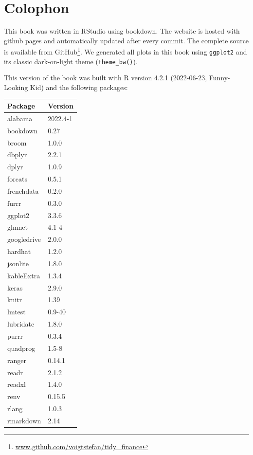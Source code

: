 \documentclass[
]{krantz}
\renewcommand{\href}[2]{#2\footnote{\url{#1}}}
\begin{document}
\hypertarget{colophon}{%
\section*{Colophon}\label{colophon}}


This book was written in RStudio using bookdown. The website is hosted with github pages and automatically updated after every commit. The complete source is \href{www.github.com/voigtstefan/tidy_finance}{available from GitHub}.
We generated all plots in this book using \texttt{ggplot2} and its classic dark-on-light theme (\texttt{theme\_bw()}).

This version of the book was built with R version 4.2.1 (2022-06-23, Funny-Looking Kid) and the following packages:

\begin{tabular}[t]{l|l}
\hline
Package & Version\\
\hline
alabama & 2022.4-1\\
\hline
bookdown & 0.27\\
\hline
broom & 1.0.0\\
\hline
dbplyr & 2.2.1\\
\hline
dplyr & 1.0.9\\
\hline
forcats & 0.5.1\\
\hline
frenchdata & 0.2.0\\
\hline
furrr & 0.3.0\\
\hline
ggplot2 & 3.3.6\\
\hline
glmnet & 4.1-4\\
\hline
googledrive & 2.0.0\\
\hline
hardhat & 1.2.0\\
\hline
jsonlite & 1.8.0\\
\hline
kableExtra & 1.3.4\\
\hline
keras & 2.9.0\\
\hline
knitr & 1.39\\
\hline
lmtest & 0.9-40\\
\hline
lubridate & 1.8.0\\
\hline
purrr & 0.3.4\\
\hline
quadprog & 1.5-8\\
\hline
ranger & 0.14.1\\
\hline
readr & 2.1.2\\
\hline
readxl & 1.4.0\\
\hline
renv & 0.15.5\\
\hline
rlang & 1.0.3\\
\hline
rmarkdown & 2.14\\

\end{tabular}
\end{document}
